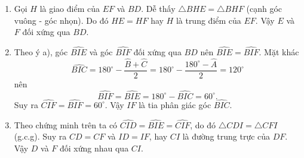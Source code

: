 \begin{bt}
{\begin{center}
		\end{center}
	\begin{enumerate}
		\item Gọi $H$ là giao điểm của $EF$ và $BD$. Dễ thấy $\triangle BHE=\triangle BHF$ (cạnh góc vuông - góc nhọn). Do đó $HE=HF$ hay $H$ là trung điểm của $EF$. Vậy $E$ và $F$ đối xứng qua $BD$.
		\item Theo ý a), góc $\widehat{BIE}$ và góc $\widehat{BIF}$ đối xứng qua $BD$ nên $\widehat{BIE}=\widehat{BIF}$. Mặt khác
		\[\widehat{BIC}=180^\circ-\dfrac{\widehat{B}+\widehat{C}}{2}=180^\circ-\dfrac{180^\circ-\widehat{A}}{2}=120^\circ \]
		nên
		\[\widehat{BIF}=\widehat{BIE}=180^\circ-\widehat{BIC}=60^\circ.\]
		Suy ra $\widehat{CIF}=\widehat{BIF}=60^\circ$. Vậy $IF$ là tia phân giác góc $\widehat{BIC}$.
		\item Theo chứng minh trên ta có $\widehat{CID}=\widehat{BIE}=\widehat{CIF}$, do đó $\triangle CDI=\triangle CFI$ (g.c.g). Suy ra $CD=CF$ và $ID=IF$, hay $CI$ là đường trung trực của $DF$.\\
		Vậy $D$ và $F$ đối xứng nhau qua $CI$.
	\end{enumerate}
	}
\end{bt}

